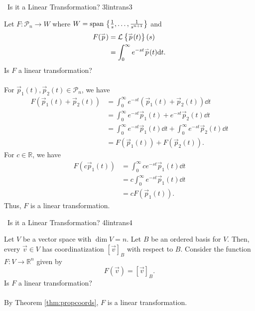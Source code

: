         \begin{example}{\Difficulty\,\Difficulty\,\,Is it a Linear Transformation? 3}{lintrans3}

            Let \(F:\mathcal{P}_{n}\to W\) where \(W=\text{span\,}\left\{\frac{1}{s},\ldots,\frac{1}{s^{n+1}}\right\}\) and
            \begin{align*}
                F(\overset{_{\rightharpoonup}}{p})&=\mathcal{L}^{}\left\{\overset{_{\rightharpoonup}}{p}(t)\right\}(s) \\
                &=\int_0^\infty e^{-st}\overset{_{\rightharpoonup}}{p}(t)\text{d} t.
            \end{align*}
            Is \(F\) a linear transformation?
            \\
            \\
            For \(\vec{p}_1(t),\vec{p}_2(t)\in\mathcal{P}_n\), we have
            \begin{align*}
                F(\vec{p}_1(t)+\vec{p}_2(t))&=\int_0^\infty e^{-st}(\vec{p}_1(t)+\vec{p}_2(t))\dd t \\
                &=\int_0^\infty e^{-st}\vec{p}_1(t)+e^{-st}\vec{p}_2(t)\dd t \\
                &=\int_0^\infty e^{-st}\vec{p}_1(t)\dd t+\int_0^\infty e^{-st}\vec{p}_2(t)\dd t \\
                &=F(\vec{p}_1(t))+F(\vec{p}_2(t)).
            \end{align*}
            For \(c\in\mathbb{R}\), we have 
            \begin{align*}
                F(c\vec{p}_1(t))&=\int_0^\infty ce^{-st}\vec{p}_1(t)\dd t \\
                &=c\int_0^\infty e^{-st}\vec{p}_1(t)\dd t \\
                &=cF(\vec{p}_1(t)).
            \end{align*}
            Thus, \(F\) is a linear transformation.
        \end{example}
        \begin{example}{\Difficulty\,\Difficulty\,\,Is it a Linear Transformation? 4}{lintrans4}

            Let \(V\) be a vector space with \(\dim V=n\). Let \(B\) be an ordered basis for \(V\). Then, every \(\vec{v}\in V\) has coordinatization \([\vec{v}]_B\) with respect to \(B\). Consider the function \(F:V\to\mathbb{R}^n\) given by 
            \begin{equation*}
                F(\vec{v})=[\vec{v}]_B.
            \end{equation*}
            Is \(F\) a linear transformation?
            \\
            \\
            By Theorem \ref{thm:propcoords}, \(F\) is a linear transformation.

        \end{example}
